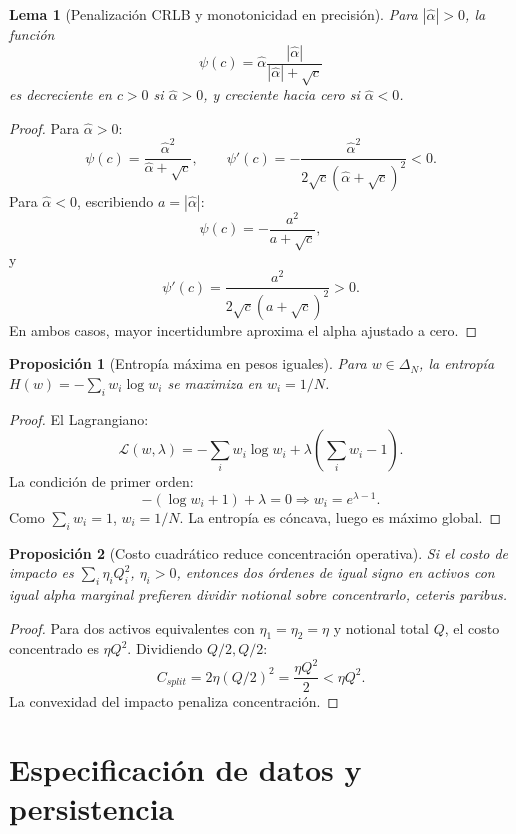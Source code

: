 \documentclass[11pt,letterpaper]{article}
\newtheorem{proposition}{Proposición}
\newtheorem{lemma}{Lema}
\newcommand{\1}{\mathbf{1}}
\begin{document}
\begin{lemma}[Penalización CRLB y monotonicidad en precisión]
Para \(|\hat\alpha|>0\), la función
\[
    \psi(c)=\hat\alpha\frac{|\hat\alpha|}{|\hat\alpha|+\sqrt{c}}
\]
es decreciente en \(c>0\) si \(\hat\alpha>0\), y creciente hacia cero si \(\hat\alpha<0\).
\end{lemma}

\begin{proof}
Para \(\hat\alpha>0\):
\[
    \psi(c)=\frac{\hat\alpha^2}{\hat\alpha+\sqrt c},
    \qquad
    \psi'(c)=
    -\frac{\hat\alpha^2}{2\sqrt c(\hat\alpha+\sqrt c)^2}<0.
\]
Para \(\hat\alpha<0\), escribiendo \(a=|\hat\alpha|\):
\[
    \psi(c)=-\frac{a^2}{a+\sqrt c},
\]
y
\[
    \psi'(c)=\frac{a^2}{2\sqrt c(a+\sqrt c)^2}>0.
\]
En ambos casos, mayor incertidumbre aproxima el alpha ajustado a cero.
\end{proof}

\begin{proposition}[Entropía máxima en pesos iguales]
Para \(w\in\Delta_N\), la entropía \(H(w)=-\sum_iw_i\log w_i\) se maximiza en \(w_i=1/N\).
\end{proposition}

\begin{proof}
El Lagrangiano:
\[
    \mathcal{L}(w,\lambda)=
    -\sum_iw_i\log w_i+\lambda\left(\sum_iw_i-1\right).
\]
La condición de primer orden:
\[
    -(\log w_i+1)+\lambda=0
    \Rightarrow
    w_i=e^{\lambda-1}.
\]
Como \(\sum_iw_i=1\), \(w_i=1/N\). La entropía es cóncava, luego es máximo global.
\end{proof}

\begin{proposition}[Costo cuadrático reduce concentración operativa]
Si el costo de impacto es \(\sum_i\eta_iQ_i^2\), \(\eta_i>0\), entonces dos órdenes de igual signo en activos con igual alpha marginal prefieren dividir notional sobre concentrarlo, ceteris paribus.
\end{proposition}

\begin{proof}
Para dos activos equivalentes con \(\eta_1=\eta_2=\eta\) y notional total \(Q\), el costo concentrado es \(\eta Q^2\). Dividiendo \(Q/2,Q/2\):
\[
    C_{split}=2\eta(Q/2)^2=\frac{\eta Q^2}{2}<\eta Q^2.
\]
La convexidad del impacto penaliza concentración.
\end{proof}

\newpage
\section{Especificación de datos y persistencia}
\end{document}
